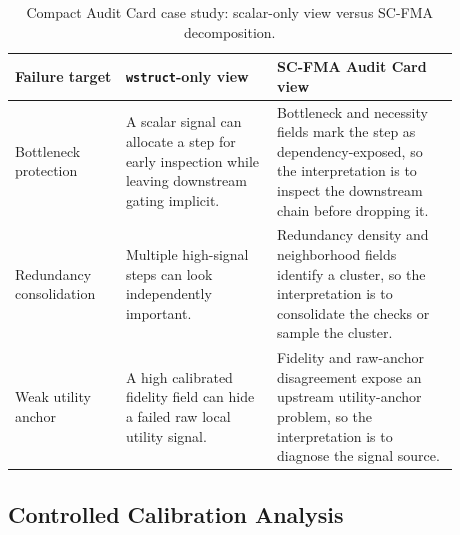 \documentclass[a4paper,fleqn]{cas-sc}
\begin{document}
\begin{table}[H]
\caption{Compact Audit Card case study: scalar-only view versus SC-FMA decomposition.}
\label{tab:compact-audit-card-case}
\centering
\small
\renewcommand{\arraystretch}{1.08}
\begin{tabular}{Z{0.22\linewidth}Z{0.30\linewidth}Z{0.36\linewidth}}
\toprule
\textbf{Failure target} & \textbf{\texttt{wstruct}-only view} & \textbf{SC-FMA Audit Card view} \\
\midrule
Bottleneck protection & A scalar signal can allocate a step for early inspection while leaving downstream gating implicit. & Bottleneck and necessity fields mark the step as dependency-exposed, so the interpretation is to inspect the downstream chain before dropping it. \\
Redundancy consolidation & Multiple high-signal steps can look independently important. & Redundancy density and neighborhood fields identify a cluster, so the interpretation is to consolidate the checks or sample the cluster. \\
Weak utility anchor & A high calibrated fidelity field can hide a failed raw local utility signal. & Fidelity and raw-anchor disagreement expose an upstream utility-anchor problem, so the interpretation is to diagnose the signal source. \\
\bottomrule
\end{tabular}
\end{table}

\subsection{Controlled Calibration Analysis}
\label{sec:controlled-calibration}
\end{document}
